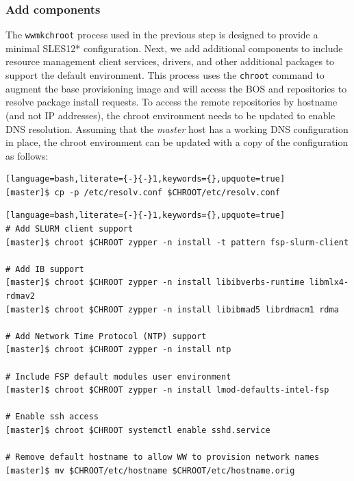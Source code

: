 \documentclass[letterpaper]{article}
\newcommand{\baseOS}{SLES12*}
\begin{document}
\subsubsection{Add \FSP{} components}

The \texttt{wwmkchroot} process used in the previous step is designed to
provide a minimal \baseOS{} configuration. Next, we add additional components to
include resource management client services, \InfiniBand{} drivers, and other
additional packages to support the default \FSP{} environment.  This process uses
the \texttt{chroot} command to augment the base provisioning image and will
access the BOS and \FSP{} repositories to resolve package install requests. To
access the remote repositories by hostname (and not IP addresses), the chroot
environment needs to be updated to enable DNS resolution. Assuming that
the {\em master} host has a working DNS configuration in place, the chroot environment can
be updated with a copy of the configuration as follows:

\begin{lstlisting}[language=bash,literate={-}{-}1,keywords={},upquote=true]
[master]$ cp -p /etc/resolv.conf $CHROOT/etc/resolv.conf
\end{lstlisting}


\begin{lstlisting}[language=bash,literate={-}{-}1,keywords={},upquote=true]
# Add SLURM client support
[master]$ chroot $CHROOT zypper -n install -t pattern fsp-slurm-client

# Add IB support
[master]$ chroot $CHROOT zypper -n install libibverbs-runtime libmlx4-rdmav2
[master]$ chroot $CHROOT zypper -n install libibmad5 librdmacm1 rdma

# Add Network Time Protocol (NTP) support
[master]$ chroot $CHROOT zypper -n install ntp

# Include FSP default modules user environment
[master]$ chroot $CHROOT zypper -n install lmod-defaults-intel-fsp

# Enable ssh access 
[master]$ chroot $CHROOT systemctl enable sshd.service

# Remove default hostname to allow WW to provision network names
[master]$ mv $CHROOT/etc/hostname $CHROOT/etc/hostname.orig
\end{lstlisting}

\end{document}

